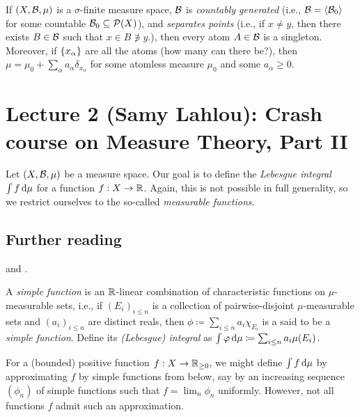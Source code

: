 \documentclass[reqno, twoside]{article}
\begin{document}
    \begin{exercise}
        If $(X,\mathcal{B},\mu)$ is a $\sigma$-finite measure space, $\mathcal{B}$ is \textit{countably generated} (i.e., $\mathcal{B}=\left\langle\mathcal{B}_0\right\rangle$ for some countable $\mathcal{B}_0\subseteq\mathcal{P}(X)$), and \textit{separates points} (i.e., if $x\neq y$, then there exists $B\in\mathcal{B}$ such that $x\in B\not\ni y$.), then every atom $A\in\mathcal{B}$ is a singleton. Moreover, if $\left\{x_\alpha\right\}$ are all the atoms (how many can there be?), then $\mu=\mu_0+\sum_\alpha a_\alpha\delta_{x_\alpha}$ for some atomless measure $\mu_0$ and some $a_\alpha\geq0$.
    \end{exercise}

    \section{Lecture 2 (Samy Lahlou): Crash course on Measure Theory, Part II}\label{sec:2}

    Let $(X,\mathcal{B},\mu)$ be a measure space. Our goal is to define the \textit{Lebesgue integral} $\int f\,\mathrm{d}\mu$ for a function $f:X\to\mathbb{R}$. Again, this is not possible in full generality, so we restrict ourselves to the so-called \textit{measurable functions}.

    {\vspace{-0.1in}\small\subsection*{Further reading}\cite[Lectures 9 to 13, 17 to 21]{Tse23} and \cite[Chapters 2 and 3]{Fol99}.}

    \begin{definition}
        A \textit{simple function} is an $\mathbb{R}$-linear combination of characteristic functions on $\mu$-measurable sets, i.e., if $(E_i)_{i\leq n}$ is a collection of pairwise-disjoint $\mu$-measurable sets and $(a_i)_{i\leq n}$ are distinct reals, then $\phi\coloneqq\sum_{i\leq n}a_i\chi_{E_i}$ is a said to be a \textit{simple function}. Define its \textit{(Lebesgue) integral} as $\int\varphi\,\mathrm{d}\mu\coloneqq\sum_{i\leq n}a_i\mu(E_i)$.
    \end{definition}

    For a (bounded) positive function $f:X\to\mathbb{R}_{\geq0}$, we might define $\int f\,\mathrm{d}\mu$ by approximating $f$ by simple functions from below, say by an increasing sequence $(\phi_n)$ of simple functions such that $f=\lim_n\phi_n$ uniformly. However, not all functions $f$ admit such an approximation.
\end{document}
